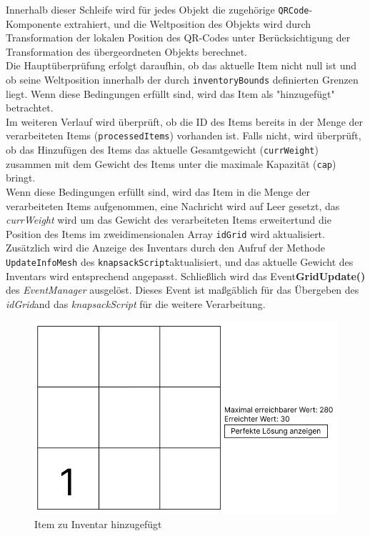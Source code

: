 Innerhalb dieser Schleife wird für jedes Objekt die zugehörige \texttt{QRCode}-Komponente extrahiert, und die Weltposition
des Objekts wird durch Transformation der lokalen Position des QR-Codes unter Berücksichtigung der Transformation des
übergeordneten Objekts berechnet.\\

Die Hauptüberprüfung erfolgt daraufhin, ob das aktuelle Item nicht null ist und ob seine Weltposition innerhalb der durch
\texttt{inventoryBounds} definierten Grenzen liegt. Wenn diese Bedingungen erfüllt sind, wird das Item als "hinzugefügt"
betrachtet.\\

Im weiteren Verlauf wird überprüft, ob die ID des Items bereits in der Menge der verarbeiteten Items (\texttt{processedItems})
vorhanden ist. Falls nicht, wird überprüft, ob das Hinzufügen des Items das aktuelle Gesamtgewicht (\texttt{currWeight})
zusammen mit dem Gewicht des Items unter die maximale Kapazität (\texttt{cap}) bringt.\\

Wenn diese Bedingungen erfüllt sind, wird das Item in die Menge der verarbeiteten Items aufgenommen, eine Nachricht wird
auf Leer gesetzt, das \textit{currWeight} wird um das Gewicht des verarbeiteten Items erweitertund die Position des
Items im zweidimensionalen Array \texttt{idGrid} wird aktualisiert. Zusätzlich wird die Anzeige des Inventars durch den
Aufruf der Methode \texttt{UpdateInfoMesh} des \texttt{knapsackScript}aktualisiert, und das aktuelle Gewicht des Inventars
wird entsprechend angepasst. Schließlich wird das Event\textbf{GridUpdate()} des \textit{EventManager} ausgelöst. Dieses
Event ist maßgäblich für das Übergeben des \textit{idGrid}and das \textit{knapsackScript} für die weitere Verarbeitung.
\begin{figure}[h]
    \centering
    \includegraphics[scale=0.6]{images/itemAdded}
    \caption{Item zu Inventar hinzugefügt}
    \label{fig:controller_itemAdded}
\end{figure}

